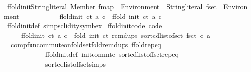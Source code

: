 \begin{isabellebody}
\isamarkupfalse%
\ ffold{\isacharunderscore}{\kern0pt}init{\isacharcolon}{\kern0pt}{\isacharcolon}{\kern0pt}{\isachardoublequoteopen}{\isacharparenleft}{\kern0pt}String{\isachardot}{\kern0pt}literal{\isacharcomma}{\kern0pt}\ Member{\isacharparenright}{\kern0pt}\ fmap\ {\isasymRightarrow}\ Environment\ {\isasymRightarrow}\ String{\isachardot}{\kern0pt}literal\ fset\ {\isasymRightarrow}\ Environment{\isachardoublequoteclose}\ \isanewline
\ \ \ \ \ \ \ \ \ \ {\isacartoucheopen}ffold{\isacharunderscore}{\kern0pt}init\ ct\ a\ c\ {\isacharequal}{\kern0pt}\ ffold\ {\isacharparenleft}{\kern0pt}init\ ct{\isacharparenright}{\kern0pt}\ a\ c{\isacartoucheclose}\isanewline
{}\isamarkupfalse%
\ ffold{\isacharunderscore}{\kern0pt}init{\isacharunderscore}{\kern0pt}def\ {\isacharbrackleft}{\kern0pt}simp{\isacharcomma}{\kern0pt}solidity{\isacharunderscore}{\kern0pt}symbex{\isacharbrackright}{\kern0pt}\isanewline
\isanewline
{}\isamarkupfalse%
\ ffold{\isacharunderscore}{\kern0pt}init{\isacharunderscore}{\kern0pt}code\ {\isacharbrackleft}{\kern0pt}code{\isacharbrackright}{\kern0pt}{\isacharcolon}{\kern0pt}\isanewline
\ \ \ \ \ {\isacartoucheopen}ffold{\isacharunderscore}{\kern0pt}init\ ct\ a\ c\ {\isacharequal}{\kern0pt}\ fold\ {\isacharparenleft}{\kern0pt}init\ ct{\isacharparenright}{\kern0pt}\ {\isacharparenleft}{\kern0pt}remdups\ {\isacharparenleft}{\kern0pt}sorted{\isacharunderscore}{\kern0pt}list{\isacharunderscore}{\kern0pt}of{\isacharunderscore}{\kern0pt}set\ {\isacharparenleft}{\kern0pt}fset\ c{\isacharparenright}{\kern0pt}{\isacharparenright}{\kern0pt}{\isacharparenright}{\kern0pt}\ a{\isacartoucheclose}\isanewline
%
\isadelimproof
\ \ %
\endisadelimproof
%
\isatagproof
{}\isamarkupfalse%
\ \ comp{\isacharunderscore}{\kern0pt}fun{\isacharunderscore}{\kern0pt}commute{\isacharunderscore}{\kern0pt}on{\isachardot}{\kern0pt}fold{\isacharunderscore}{\kern0pt}set{\isacharunderscore}{\kern0pt}fold{\isacharunderscore}{\kern0pt}remdups\ ffold{\isachardot}{\kern0pt}rep{\isacharunderscore}{\kern0pt}eq\ \isanewline
\ \ \ \ \ \ \ \ \ \ \ \ ffold{\isacharunderscore}{\kern0pt}init{\isacharunderscore}{\kern0pt}def\ init{\isacharunderscore}{\kern0pt}commte\ sorted{\isacharunderscore}{\kern0pt}list{\isacharunderscore}{\kern0pt}of{\isacharunderscore}{\kern0pt}fset{\isachardot}{\kern0pt}rep{\isacharunderscore}{\kern0pt}eq\ \isanewline
\ \ \ \ \ \ \ \ \ \ \ \ sorted{\isacharunderscore}{\kern0pt}list{\isacharunderscore}{\kern0pt}of{\isacharunderscore}{\kern0pt}fset{\isacharunderscore}{\kern0pt}simps{\isacharparenleft}{\kern0pt}{}{\isacharparenright}{\kern0pt}\isanewline

\end{isabellebody}
